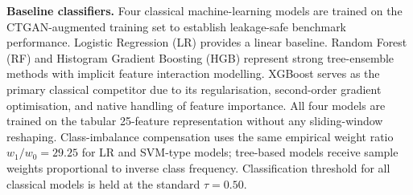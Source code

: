 \documentclass[sensors,article,submit,pdftex,moreauthors]{Definitions/mdpi}
\begin{document}
\textbf{Baseline classifiers.}
Four classical machine-learning models are trained on the CTGAN-augmented training set to establish leakage-safe benchmark performance.
Logistic Regression (LR) provides a linear baseline.
Random Forest (RF) and Histogram Gradient Boosting (HGB) represent strong tree-ensemble methods with implicit feature interaction modelling.
XGBoost serves as the primary classical competitor due to its regularisation, second-order gradient optimisation, and native handling of feature importance.
All four models are trained on the tabular 25-feature representation without any sliding-window reshaping.
Class-imbalance compensation uses the same empirical weight ratio $w_1/w_0 = 29.25$ for LR and SVM-type models; tree-based models receive sample weights proportional to inverse class frequency.
Classification threshold for all classical models is held at the standard $\tau = 0.50$.
\end{document}
